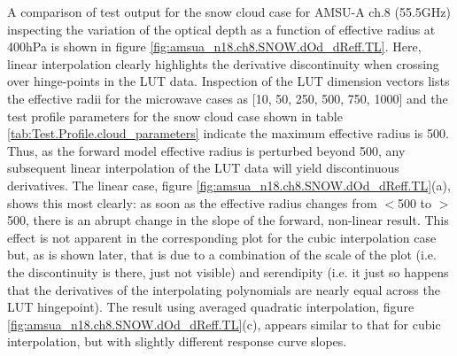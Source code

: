 A comparison of test output for the snow cloud case for AMSU-A ch.8 (55.5GHz) inspecting the variation of the optical depth as a function of effective radius at 400hPa is shown in figure \ref{fig:amsua_n18.ch8.SNOW.dOd_dReff.TL}. Here, linear interpolation clearly highlights the derivative discontinuity when crossing over hinge-points in the LUT data. Inspection of the LUT dimension vectors lists the effective radii for the microwave cases as [10, 50, 250, 500, 750, 1000] and the test profile parameters for the snow cloud case shown in table \ref{tab:Test.Profile.cloud_parameters} indicate the maximum effective radius is 500\micron. Thus, as the forward model effective radius is perturbed beyond 500\micron, any subsequent linear interpolation of the LUT data will yield discontinuous derivatives. The linear case, figure \ref{fig:amsua_n18.ch8.SNOW.dOd_dReff.TL}(a), shows this most clearly: as soon as the effective radius changes from $<$500\micron{} to $>$500\micron, there is an abrupt change in the slope of the forward, non-linear result. This effect is not apparent in the corresponding plot for the cubic interpolation case but, as is shown later, that is due to a combination of the scale of the plot (i.e. the discontinuity is there, just not visible) and serendipity (i.e. it just so happens that the derivatives of the interpolating polynomials are nearly equal across the LUT hingepoint). The result using averaged quadratic interpolation, figure \ref{fig:amsua_n18.ch8.SNOW.dOd_dReff.TL}(c), appears similar to that for cubic interpolation, but with slightly different response curve slopes.

